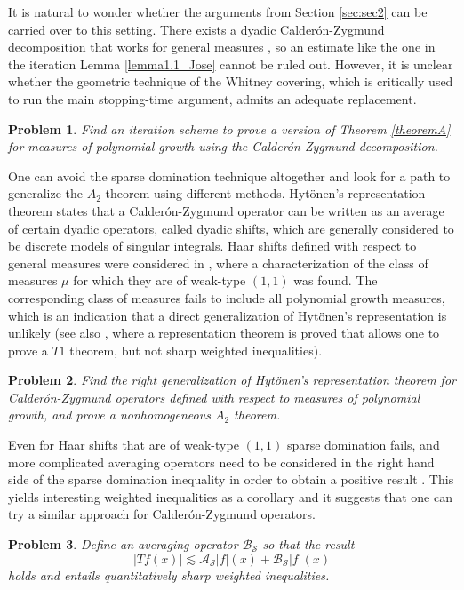 \documentclass[12pt]{amsart}
\newcommand{\Ss}{\mathcal{S}}
\newcommand{\AS}{\mathcal{A}_{\Ss}}
\theoremstyle{plain}
\newtheorem{problem}{Problem}[section]
\theoremstyle{definition} %
\numberwithin{equation}{section}
\begin{document}
It is natural to wonder whether the arguments from Section \ref{sec:sec2} can be carried over to this setting. There exists a dyadic Calder\'on-Zygmund decomposition that works for general measures \cite{CCP2022}, so an estimate like the one in the iteration Lemma \ref{lemma1.1_Jose} cannot be ruled out. However, it is unclear whether the geometric technique of the Whitney covering, which is critically used to run the main stopping-time argument, admits an adequate replacement.

\begin{problem}
Find an iteration scheme to prove a version of Theorem \ref{theoremA} for measures of polynomial growth using the Calder\'on-Zygmund decomposition.
\end{problem}

One can avoid the sparse domination technique altogether and look for a path to generalize the $A_2$ theorem using different methods. Hyt\"onen's representation theorem \cite{Hy2012} states that a Calder\'on-Zygmund operator can be written as an average of certain dyadic operators, called dyadic shifts, which are generally considered to be discrete models of singular integrals. Haar shifts defined with respect to general measures were considered in \cite{LSMP2012}, where a characterization of the class of measures $\mu$ for which they are of weak-type $(1,1)$ was found. The corresponding class of measures fails to include all polynomial growth measures, which is an indication that a direct generalization of Hyt\"onen's representation is unlikely (see also \cite{deLaHerran}, where a representation theorem is proved that allows one to prove a $T1$ theorem, but not sharp weighted inequalities). 

\begin{problem}
Find the right generalization of Hyt\"onen's representation theorem for Calder\'on-Zygmund operators defined with respect to measures of polynomial growth, and prove a nonhomogeneous $A_2$ theorem.
\end{problem}

Even for Haar shifts that are of weak-type $(1,1)$ sparse domination fails, and more complicated averaging operators need to be considered in the right hand side of the sparse domination inequality in order to obtain a positive result \cite{CPW2023}. This yields interesting weighted inequalities as a corollary and it suggests that one can try a similar approach for Calder\'on-Zygmund operators.

\begin{problem}
Define an averaging operator $\mathcal{B}_\Ss$ so that the result
$$
|Tf(x)| \lesssim \AS|f|(x) + \mathcal{B}_\Ss|f|(x)
$$
holds and entails quantitatively sharp weighted inequalities. 
\end{problem}
\end{document}
